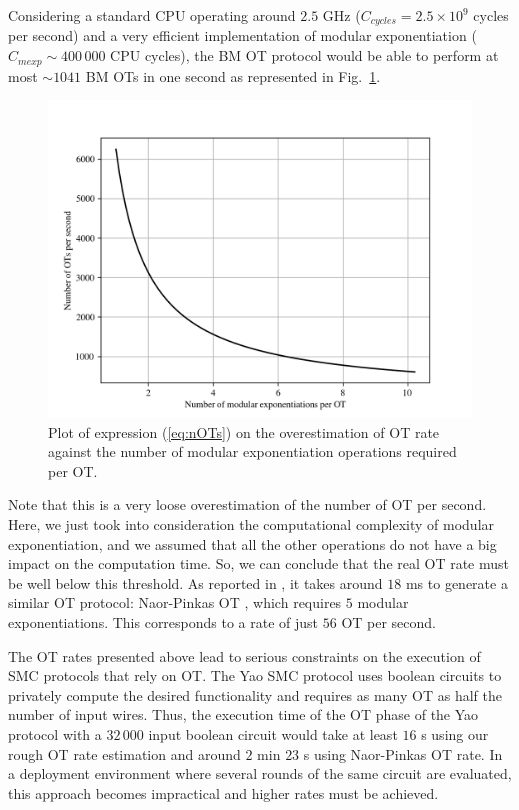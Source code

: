 Considering a standard CPU operating around $2.5$ GHz ($C_{cycles} = 2.5\times 10^9 $ cycles per second) and a very efficient implementation of modular exponentiation \cite{G11} ($C_{mexp} \sim 400\,000$ CPU cycles), the BM OT protocol would be able to perform at most $\sim 1041$ BM OTs in one second as represented in Fig.~\ref{fig:nOTsplot}.
\begin{figure}[]
\centering
\includegraphics[width=1\textwidth]{Chapter_QuantumAndClassicalObliviousTransfer/nOTperSeccond.png}
\caption{Plot of expression (\ref{eq:nOTs}) on the overestimation of OT rate against the number of modular exponentiation operations required per OT.}
\label{fig:nOTsplot}
\end{figure}
Note that this is a very loose overestimation of the number of OT per second. Here, we just took into consideration the computational complexity of modular exponentiation, and we assumed that all the other operations do not have a big impact on the computation time. So, we can conclude that the real OT rate must be well below this threshold. As reported in \cite{ALSZ13}, it takes around $18$ ms to generate a similar OT protocol: Naor-Pinkas OT \cite{NP01}, which requires $5$ modular exponentiations. This corresponds to a rate of just $56$ OT per second.

The OT rates presented above lead to serious constraints on the execution of SMC protocols that rely on OT. The Yao SMC protocol \cite{Yao82} uses boolean circuits to privately compute the desired functionality and requires as many OT as half the number of input wires. Thus, the execution time of the OT phase of the Yao protocol with a $32\, 000$ input boolean circuit would take at least $16$ s using our rough  OT rate estimation and around $2$ min $23$ s using Naor-Pinkas OT rate. In a deployment environment where several rounds of the same circuit are evaluated, this approach becomes impractical and higher rates must be achieved.

